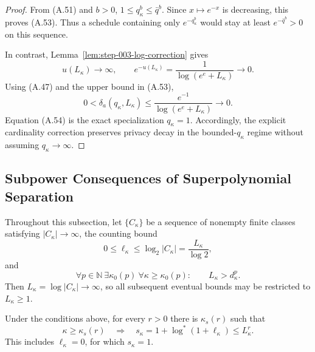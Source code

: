 \begin{proof}
From (A.51) and \(b>0\),
\(1\leq q_\kappa^b\leq\bar q^b\).  Since \(x\mapsto e^{-x}\) is
decreasing, this proves (A.53).  Thus a schedule containing only
\(e^{-q_\kappa^b}\) would stay at least
\(e^{-\bar q^b}>0\) on this sequence.

In contrast, Lemma~\ref{lem:step-003-log-correction} gives
\[
u(L_\kappa)\to\infty,\qquad
e^{-u(L_\kappa)}
=\frac1{\log(e^e+L_\kappa)}
\longrightarrow0.
\tag{A.55}
\]
Using (A.47) and the upper bound in (A.53),
\[
0<\delta_a(q_\kappa,L_\kappa)
\leq\frac{e^{-1}}{\log(e^e+L_\kappa)}
\longrightarrow0.
\tag{A.56}
\]
Equation (A.54) is the exact specialization \(q_\kappa=1\).
Accordingly, the explicit cardinality correction preserves privacy
decay in the bounded-\(q_\kappa\) regime without assuming
\(q_\kappa\to\infty\).
\end{proof}

\subsection{Subpower Consequences of Superpolynomial Separation}
\label{app:subpower}

Throughout this subsection, let \(\{C_\kappa\}\) be a sequence of
nonempty finite classes satisfying \(|C_\kappa|\to\infty\), the
counting bound
\[
0\leq\ell_\kappa\leq\log_2|C_\kappa|
=\frac{L_\kappa}{\log2},
\]
and
\[
\forall p\in\mathbb N\ \exists\kappa_0(p)\
\forall\kappa\geq\kappa_0(p):
\qquad L_\kappa>d_\kappa^p.
\tag{A.57}
\]
Then \(L_\kappa=\log|C_\kappa|\to\infty\), so all subsequent
eventual bounds may be restricted to \(L_\kappa\geq1\).

\begin{lemma}
\label{lem:step-004-iterated-log-subpower}
Under the conditions above, for every \(r>0\) there is
\(\kappa_s(r)\) such that
\[
\kappa\geq\kappa_s(r)
\quad\Longrightarrow\quad
s_\kappa=1+\log^*(1+\ell_\kappa)
\leq L_\kappa^r.
\tag{A.58}
\]
This includes \(\ell_\kappa=0\), for which \(s_\kappa=1\).
\end{lemma}

